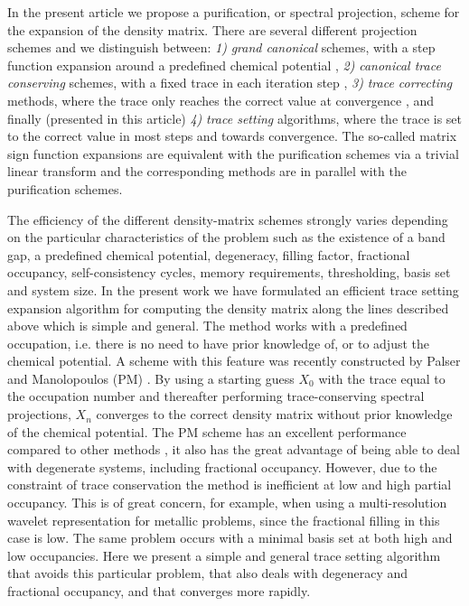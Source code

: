 In the present article we propose a purification, or spectral projection,
scheme for the expansion of the density matrix. There are several different
projection schemes and we distinguish between: {\it 1)} {\it grand canonical}
schemes, with a step function  expansion around a predefined chemical potential \cite{McWeeny60},
{\it 2)} {\it canonical trace conserving} schemes, with a fixed trace
in each iteration step \cite{Palser98}, {\it 3)} {\it trace correcting} methods,
where the trace only reaches the correct value at convergence \cite{Niklasson02b}, 
and finally (presented in this article) {\it 4)} {\it trace setting} algorithms, where the trace is set 
to the correct value in most steps and towards convergence. The so-called matrix sign function
expansions are equivalent with the purification schemes via a trivial
linear transform and the corresponding methods are in parallel with the purification schemes.

The efficiency of the different density-matrix schemes strongly
varies depending on the particular characteristics of the problem such as
the existence of a band gap, a predefined chemical potential, degeneracy, filling factor, 
fractional occupancy, self-consistency cycles, memory requirements, thresholding, 
basis set and system size. 
In the present work we have formulated an efficient trace setting expansion 
algorithm for computing the density matrix along the lines described above which
is simple and general. The method works with a predefined occupation, i.e.
there is no need to have prior knowledge of, or to adjust the chemical potential. 
A scheme with this feature was recently constructed by Palser and Manolopoulos 
(PM) \cite{Palser98}. By using a starting guess $X_0$ with the trace equal to 
the occupation number and thereafter performing trace-conserving
spectral projections, $X_n$ converges to the correct density matrix without
prior knowledge of the chemical potential. The PM scheme has an excellent
performance compared to other methods \cite{Daniels99,Palser98}, it also
has the great advantage of being able to deal with degenerate systems,
including fractional occupancy.
However, due to the constraint of trace conservation the method is inefficient
at low and high partial occupancy. This is of great concern,
for example, when using a multi-resolution wavelet representation for metallic problems,
since the fractional filling in this case is low. The same
problem occurs with a minimal basis set at both high and low
occupancies. Here we present a simple and general trace setting algorithm that avoids 
this particular problem, that also deals with degeneracy and fractional occupancy,
and that converges more rapidly.

